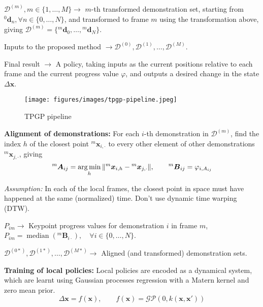 \( \mathcal{D}^{(m)}, m \in \{ 1, \ldots, M \} \to \) \( m \)-th transformed demonstration set, starting from \( {}^{0}\boldsymbol{d}_n, \forall n \in \{ 0, \ldots, N \} \), and transformed to frame \( m \) using the transformation above, giving \( \mathcal{D}^{(m)} = \{ {}^{m}\boldsymbol{d}_0, \ldots, {}^{m}\boldsymbol{d}_N \} \).

Inputs to the proposed method \( \to \mathcal{D}^{(0)}, \mathcal{D}^{(1)}, \ldots, \mathcal{D}^{(M)} \).

Final result \( \to \) A policy, taking inputs as the current positions relative to each frame and the current progress value \( \varphi \), and outputs a desired change in the state \( \Delta \boldsymbol{x} \).

\begin{figure}[htbp]
    \centering
    \texttt{[image: figures/images/tpgp-pipeline.jpeg]}
    \caption{
        TPGP pipeline
    }\label{fig:tpgp-pipeline}
\end{figure}

\newpage
\textbf{Alignment of demonstrations:}
For each \( i \)-th demonstration in \( \mathcal{D}^{(m)} \), find the index \( h \) of the closest point \( {}^{m}\boldsymbol{x}_{i, \cdot} \) to every other element of other demonstrations \( {}^{m}\boldsymbol{x}_{j, \cdot} \), giving
\begin{equation}
    {}^{m}\boldsymbol{A}_{ij} = \operatorname*{arg\,min}_{h} \Vert {}^{m}\boldsymbol{x}_{i, h} - {}^{m}\boldsymbol{x}_{j, \cdot} \Vert
    , \qquad
    {}^{m}\boldsymbol{B}_{ij} = \varphi_{i, A_{ij}}
\end{equation}

\textit{Assumption:} In each of the local frames, the closest point in space must have happened at the same (normalized) time.
Don't use dynamic time warping (DTW).

\( P_{im} \to \) Keypoint progress values for demonstration \( i \) in frame \( m \), \( P_{im} = \operatorname{median}({}^{m}\boldsymbol{B}_{i\cdot}), \quad \forall i \in \{ 0, \ldots, N \} \).

\( \mathcal{D}^{(0*)}, \mathcal{D}^{(1*)}, \ldots, \mathcal{D}^{(M*)} \to \) Aligned (and transformed) demonstration sets.

\textbf{Training of local policies:}
Local policies are encoded as a dynamical system, which are learnt using Gaussian processes regression with a Matern kernel and zero mean prior.
\begin{equation}
    \Delta\boldsymbol{x} = f(\boldsymbol{x})
    , \qquad
    f(\boldsymbol{x}) = \mathcal{GP}(0, k(\boldsymbol{x}, \boldsymbol{x}'))
\end{equation}
